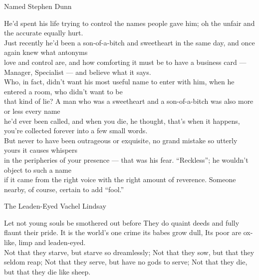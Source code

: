 \begin{poem}
{Named}
{Stephen Dunn}

He'd spent his life trying to control the names people gave him;
oh the unfair and the accurate equally hurt.\\

Just recently he'd been a son-of-a-bitch and sweetheart in the same day,
and once again knew what antonyms\\

love and control are, and how comforting it must be to have a business card ---
Manager, Specialist --- and believe what it says.\\

Who, in fact, didn't want his most useful name to enter with him,
when he entered a room, who didn't want to be\\

that kind of lie? A man who was a sweetheart and a son-of-a-bitch
was also more or less every name\\

he'd ever been called, and when you die, he thought, that's when it happens,
you're collected forever into a few small words.\\

But never to have been outrageous or exquisite, no grand mistake
so utterly yours it causes whispers\\

in the peripheries of your presence --- that was his fear.
``Reckless''; he wouldn't object to such a name\\

if it came from the right voice with the right amount of reverence.
Someone nearby, of course, certain to add ``fool.'' 
\end{poem}


\begin{poem}
{The Leaden-Eyed}
{Vachel Lindsay}

 Let not young souls be smothered out before
 They do quaint deeds and fully flaunt their pride.
 It is the world's one crime its babes grow dull,
 Its poor are ox-like, limp and leaden-eyed.\\

 Not that they starve, but starve so dreamlessly;
 Not that they sow, but that they seldom reap;
 Not that they serve, but have no gods to serve;
 Not that they die, but that they die like sheep.
\end{poem}

